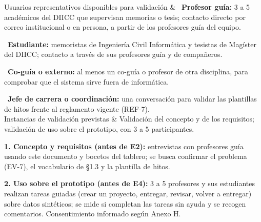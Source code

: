 \documentclass[10pt,a4paper]{article}
\newenvironment{kv}[1][4.6cm]
  {\footnotesize\setlength{\extrarowheight}{3pt}\xltabular{\linewidth}{|E{#1}|L|}\hline}
  {\endxltabular}
\newcommand{\kvrow}[2]{#1 & #2 \\ \hline}
\begin{document}
\begin{kv}[4.6cm]
\kvrow{Usuarios representativos disponibles para validación}{%
\textbullet~\textbf{Profesor guía:} 3 a 5 académicos del DIICC que supervisan memorias o tesis; contacto directo por correo institucional o en persona, a partir de los profesores guía del equipo.\par
\textbullet~\textbf{Estudiante:} memoristas de Ingeniería Civil Informática y tesistas de Magíster del DIICC; contacto a través de sus profesores guía y de compañeros.\par
\textbullet~\textbf{Co-guía o externo:} al menos un co-guía o profesor de otra disciplina, para comprobar que el sistema sirve fuera de informática.\par
\textbullet~\textbf{Jefe de carrera o coordinación:} una conversación para validar las plantillas de hitos frente al reglamento vigente (REF-7).}
\kvrow{Instancias de validación previstas}{Validación del concepto y de los requisitos; validación de uso sobre el prototipo, con 3 a 5 participantes.\par
\textbf{1. Concepto y requisitos (antes de E2):} entrevistas con profesores guía usando este documento y bocetos del tablero; se busca confirmar el problema (EV-7), el vocabulario de §1.3 y la plantilla de hitos.\par
\textbf{2. Uso sobre el prototipo (antes de E4):} 3 a 5 profesores y sus estudiantes realizan tareas guiadas (crear un proyecto, entregar, revisar, volver a entregar) sobre datos sintéticos; se mide si completan las tareas sin ayuda y se recogen comentarios. Consentimiento informado según Anexo H.}
\end{kv}
\end{document}
